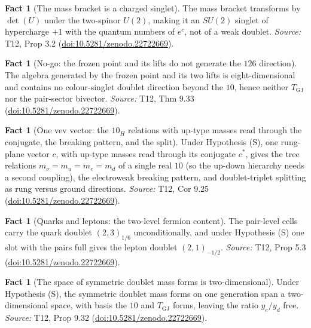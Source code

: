 \documentclass[11pt]{article}
\theoremstyle{definition}
\newtheorem{fact}[theorem]{Fact}
\theoremstyle{plain}
\begin{document}
\begin{fact}[The mass bracket is a charged singlet]\label{c:standard-model.mass-bracket-charged-singlet}
The mass bracket transforms by $\det(U)$ under the two-spinor $U(2)$, making it an $SU(2)$ singlet of hypercharge $+1$ with the quantum numbers of $e^{c}$, not of a weak doublet.
\emph{Source:} T12, Prop 3.2 (\href{https://doi.org/10.5281/zenodo.22722669}{doi:10.5281/zenodo.22722669}).
\end{fact}

\begin{fact}[No-go: the frozen point and its lifts do not generate the $126$ direction]\label{c:standard-model.no-go-frozen-point-lifts-do}
The algebra generated by the frozen point and its two lifts is eight-dimensional and contains no colour-singlet doublet direction beyond the $10$, hence neither $T_{\mathrm{GJ}}$ nor the pair-sector bivector.
\emph{Source:} T12, Thm 9.33 (\href{https://doi.org/10.5281/zenodo.22722669}{doi:10.5281/zenodo.22722669}).
\end{fact}

\begin{fact}[One vev vector: the $10_{H}$ relations with up-type masses read through the conjugate, the breaking pattern, and the split]\label{c:standard-model.one-vev-vector-relations-breaking-pattern}
Under Hypothesis (S), one rung-plane vector $c$, with up-type masses read through its conjugate $c^{*}$, gives the tree relations $m_{\nu} = m_{u} = m_{e} = m_{d}$ of a single real $10$ (so the up-down hierarchy needs a second coupling), the electroweak breaking pattern, and doublet-triplet splitting as rung versus ground directions.
\emph{Source:} T12, Cor 9.25 (\href{https://doi.org/10.5281/zenodo.22722669}{doi:10.5281/zenodo.22722669}).
\end{fact}

\begin{fact}[Quarks and leptons: the two-level fermion content]\label{c:standard-model.quarks-leptons-two-level-fermion-content}
The pair-level cells carry the quark doublet $(2,3)_{1/6}$ unconditionally, and under Hypothesis (S) one slot with the pairs full gives the lepton doublet $(2,1)_{-1/2}$.
\emph{Source:} T12, Prop 5.3 (\href{https://doi.org/10.5281/zenodo.22722669}{doi:10.5281/zenodo.22722669}).
\end{fact}

\begin{fact}[The space of symmetric doublet mass forms is two-dimensional]\label{c:standard-model.space-symmetric-doublet-mass-forms-two}
Under Hypothesis (S), the symmetric doublet mass forms on one generation span a two-dimensional space, with basis the $10$ and $T_{\mathrm{GJ}}$ forms, leaving the ratio $y_{e}/y_{d}$ free.
\emph{Source:} T12, Prop 9.32 (\href{https://doi.org/10.5281/zenodo.22722669}{doi:10.5281/zenodo.22722669}).
\end{fact}
\end{document}
